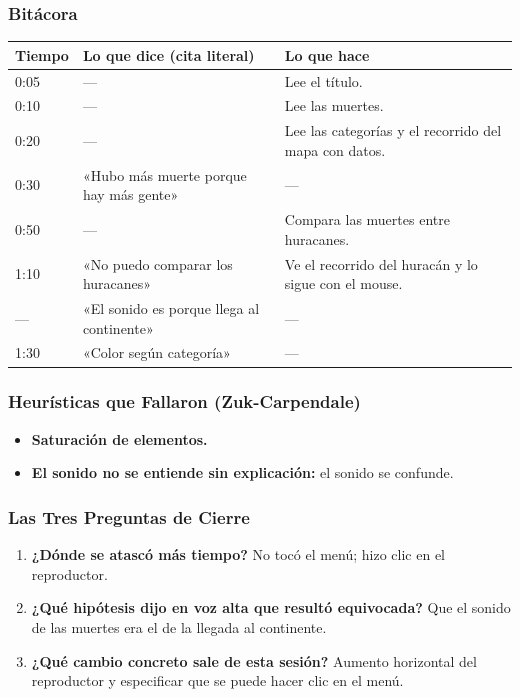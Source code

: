 \documentclass[11pt,a4paper]{article}
\begin{document}
	\subsubsection{Bitácora}
	\begin{center}
		\small
		\begin{tabularx}{\textwidth}{lp{6.8cm}X}
			\toprule
			\textbf{Tiempo} & \textbf{Lo que dice (cita literal)} & \textbf{Lo que hace} \\
			\midrule
			0:05 & --- & Lee el título. \\
			0:10 & --- & Lee las muertes. \\
			0:20 & --- & Lee las categorías y el recorrido del mapa con datos. \\
			0:30 & «Hubo más muerte porque hay más gente» & --- \\
			0:50 & --- & Compara las muertes entre huracanes. \\
			1:10 & «No puedo comparar los huracanes» & Ve el recorrido del huracán y lo sigue con el mouse. \\
			--- & «El sonido es porque llega al continente» & --- \\
			1:30 & «Color según categoría» & --- \\
			\bottomrule
		\end{tabularx}
	\end{center}

	\subsubsection{Heurísticas que Fallaron (Zuk-Carpendale)}
	\begin{itemize}
		\item \textbf{Saturación de elementos.}
		\item \textbf{El sonido no se entiende sin explicación:} el sonido se confunde.
	\end{itemize}

	\subsubsection{Las Tres Preguntas de Cierre}
	\begin{enumerate}
		\item \textbf{¿Dónde se atascó más tiempo?} No tocó el menú; hizo clic en el reproductor.
		\item \textbf{¿Qué hipótesis dijo en voz alta que resultó equivocada?} Que el sonido de las muertes era el de la llegada al continente.
		\item \textbf{¿Qué cambio concreto sale de esta sesión?} Aumento horizontal del reproductor y especificar que se puede hacer clic en el menú.
	\end{enumerate}
\end{document}
